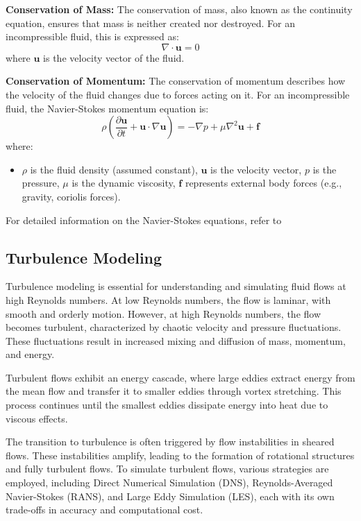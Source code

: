\textbf{Conservation of Mass:}
The conservation of mass, also known as the continuity equation, ensures that mass is neither
created nor destroyed. For an incompressible fluid, this is expressed as:
\begin{equation}
\nabla \cdot \mathbf{u} = 0
\end{equation}
where $\mathbf{u}$ is the velocity vector of the fluid.

\textbf{Conservation of Momentum:}
The conservation of momentum describes how the velocity of the fluid changes due to forces acting on it. For an incompressible fluid, the Navier-Stokes momentum equation is:
\begin{equation}
\rho \left( \frac{\partial \mathbf{u}}{\partial t} + \mathbf{u} \cdot \nabla \mathbf{u} \right) = -\nabla p + \mu \nabla^2 \mathbf{u} + \mathbf{f}
\end{equation}
where:
\begin{itemize}
    \item $\rho$ is the fluid density (assumed constant), $\mathbf{u}$ is the velocity vector, $p$ is the pressure, $\mu$ is the dynamic viscosity, $\mathbf{f}$ represents external body forces (e.g., gravity, coriolis forces).
\end{itemize}
For detailed information on the Navier-Stokes equations, refer to \cite{NSeqn}

\subsection{Turbulence Modeling}

Turbulence modeling is essential for understanding and simulating fluid flows at high Reynolds numbers. At low Reynolds numbers, the flow is laminar, with smooth and orderly motion. However, at high Reynolds numbers, the flow becomes turbulent, characterized by chaotic velocity and pressure fluctuations. These fluctuations result in increased mixing and diffusion of mass, momentum, and energy.

Turbulent flows exhibit an energy cascade, where large eddies extract energy from the mean flow and transfer it to smaller eddies through vortex stretching. This process continues until the smallest eddies dissipate energy into heat due to viscous effects.

The transition to turbulence is often triggered by flow instabilities in sheared flows. These instabilities amplify, leading to the formation of rotational structures and fully turbulent flows. To simulate turbulent flows, various strategies are employed, including Direct Numerical Simulation (DNS), Reynolds-Averaged Navier-Stokes (RANS), and Large Eddy Simulation (LES), each with its own trade-offs in accuracy and computational cost.

